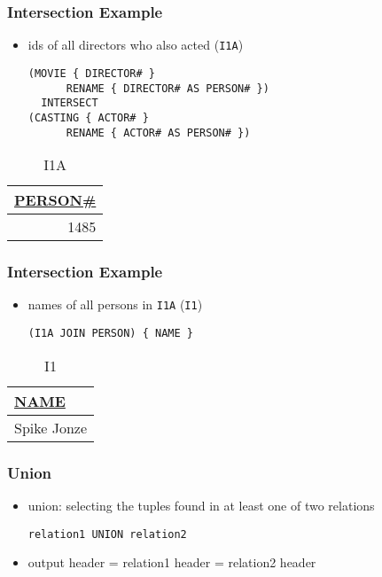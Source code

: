 \documentclass[dvipsnames]{beamer}
\theoremstyle{plain}
\begin{document}
\begin{frame}[fragile]
  \frametitle{Intersection Example}

  \begin{itemize}
    \item ids of all directors who also acted (\texttt{I1A})
    \begin{lstlisting}
(MOVIE { DIRECTOR# }
      RENAME { DIRECTOR# AS PERSON# })
  INTERSECT
(CASTING { ACTOR# }
      RENAME { ACTOR# AS PERSON# })
    \end{lstlisting}
  \end{itemize}

  \vspace{-10pt}
  \begin{tiny}
  \begin{table}
    \caption{I1A}
    \begin{tabular}{|r|}\hline
\underline{PERSON\#}\\[2pt]\hline\hline
                1485\\\hline
    \end{tabular}
  \end{table}
  \end{tiny}
\end{frame}

\begin{frame}[fragile]
  \frametitle{Intersection Example}

  \begin{itemize}
    \item names of all persons in \texttt{I1A} (\texttt{I1})
    \begin{lstlisting}
(I1A JOIN PERSON) { NAME }
    \end{lstlisting}
  \end{itemize}

  \vspace{-10pt}
  \begin{tiny}
  \begin{table}
    \caption{I1}
    \begin{tabular}{|l|}\hline
\underline{NAME}\\[2pt]\hline\hline
Spike Jonze     \\\hline
    \end{tabular}
  \end{table}
  \end{tiny}
\end{frame}

\begin{frame}[fragile]
  \frametitle{Union}

  \begin{itemize}
    \item \alert{union}: selecting the tuples found in at least one of two
      relations
    \begin{lstlisting}
relation1 UNION relation2
    \end{lstlisting}

    \medskip
    \item output header = relation1 header = relation2 header
  \end{itemize}
\end{frame}
\end{document}
